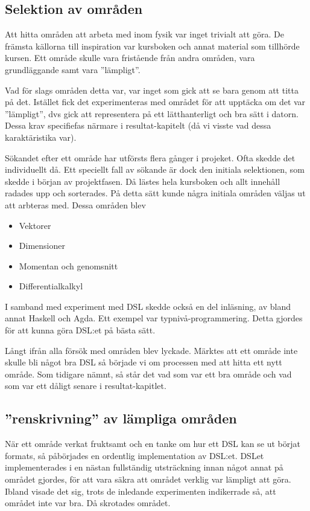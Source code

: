 \begin{binge}
\subsection{Selektion av områden}

Att hitta områden att arbeta med inom fysik var inget trivialt att göra. De främsta källorna till inspiration var kursboken och annat material som tillhörde kursen. Ett område skulle vara fristående från andra områden, vara grundläggande samt vara ''lämpligt''.

Vad för slags områden detta var, var inget som gick att se bara genom att titta på det. Istället fick det experimenteras med området för att upptäcka om det var ''lämpligt'', dvs gick att representera på ett lätthanterligt och bra sätt i datorn. Dessa krav specifiefas närmare i resultat-kapitelt (då vi visste vad dessa karaktäristika var).

Sökandet efter ett område har utförsts flera gånger i projeket. Ofta skedde det individuellt då. Ett speciellt fall av sökande är dock den initiala selektionen, som skedde i början av projektfasen. Då lästes hela kursboken och allt innehåll radades upp och sorterades. På detta sätt kunde några initiala områden väljas ut att arbteras med. Dessa områden blev

\begin{itemize}
  \item Vektorer
  \item Dimensioner
  \item Momentan och genomsnitt
  \item Differentialkalkyl
\end{itemize}

I samband med experiment med DSL skedde också en del inläsning, av bland annat Haskell och Agda. Ett exempel var typnivå-programmering. Detta gjordes för att kunna göra DSL:et på bästa sätt.

Långt ifrån alla försök med områden blev lyckade. Märktes att ett område inte skulle bli något bra DSL så började vi om processen med att hitta ett nytt område. Som tidigare nämnt, så står det vad som var ett bra område och vad som var ett dåligt senare i resultat-kapitlet.

\subsection{''renskrivning'' av lämpliga områden}

När ett område verkat fruktsamt och en tanke om hur ett DSL kan se ut börjat formats, så påbörjades en ordentlig implementation av DSL:et. DSLet implementerades i en nästan fullständig utsträckning innan något annat på området gjordes, för att vara säkra att området verklig var lämpligt att göra. Ibland visade det sig, trots de inledande experimenten indikerrade så, att området inte var bra. Då skrotades området.


\end{binge}
